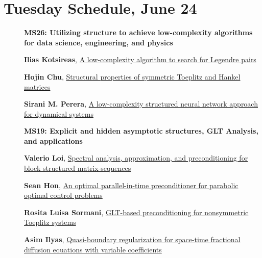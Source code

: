 \documentclass[ILAS2025-program.tex]{subfiles}
\begin{document}
\section*{Tuesday Schedule, June 24 }
        
        \begin{description}
    \item[] {\color{mstitle}\textbf{MS26: Utilizing structure to achieve low-complexity algorithms for data science, engineering, and physics}} 
    \item[] \hypertarget{up0135}{}\textbf{Ilias Kotsireas}, \hyperlink{down0135}{A low-complexity algorithm to search for Legendre pairs
}
        \item[] \hypertarget{up0136}{}\textbf{Hojin Chu}, \hyperlink{down0136}{Structural properties of symmetric Toeplitz and Hankel matrices}
        \item[] \hypertarget{up0137}{}\textbf{Sirani M. Perera}, \hyperlink{down0137}{A low-complexity structured neural network approach for dynamical systems}
        \end{description}
    \begin{description}
    \item[] {\color{mstitle}\textbf{MS19: Explicit and hidden asymptotic structures, GLT Analysis, and applications}} 
    \item[] \hypertarget{up0173}{}\textbf{Valerio Loi}, \hyperlink{down0173}{Spectral analysis, approximation, and preconditioning for block structured matrix-sequences}
        \item[] \hypertarget{up0174}{}\textbf{Sean Hon}, \hyperlink{down0174}{An optimal parallel-in-time preconditioner for parabolic optimal control problems}
        \item[] \hypertarget{up0175}{}\textbf{Rosita Luisa Sormani}, \hyperlink{down0175}{GLT-based preconditioning for nonsymmetric Toeplitz systems}
        \item[] \hypertarget{up0176}{}\textbf{Asim Ilyas}, \hyperlink{down0176}{Quasi-boundary regularization for space-time fractional diffusion equations with variable coefficients}
        \end{description}
\end{document}
